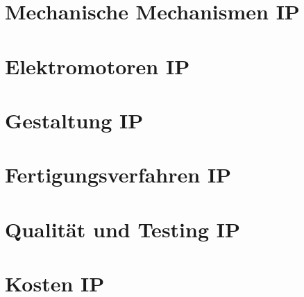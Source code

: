 \documentclass[numerate]{cheatsheet}
\begin{document}
\section{Mechanische Mechanismen \hfill IP}
    
    
    
    
    
    \cbreak
    
    
    

\section{Elektromotoren \hfill IP}
    
    
    
    

\section{Gestaltung \hfill IP}
    
    
    

\section{Fertigungsverfahren \hfill IP}
    
    
    
    \cbreak
    

\section{Qualität und Testing \hfill IP}
    
    
    
    
    
    \cbreak

\section{Kosten \hfill IP}
    
    
    
    
    
    
    \cbreak
\end{document}
